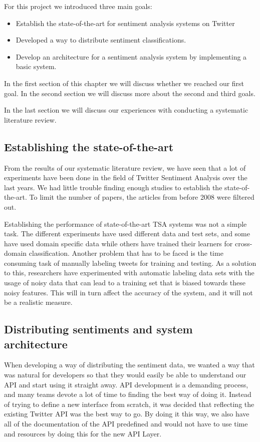 
For this project we introduced three main goals:
\begin{itemize}
\item Establish the state-of-the-art for sentiment analysis systems on Twitter
\item Developed a way to distribute sentiment classifications.
\item Develop an architecture for a sentiment analysis system by implementing a basic system.
\end{itemize}

In the first section of this chapter we will discuss whether we reached our first goal. In the second section we will discuss more about the second and third goals. 

In the last section we will discuss our experiences with conducting a systematic literature review. 


\subsection{Establishing the state-of-the-art}
From the results of our systematic literature review, we have seen that a lot of experiments have been done in the field of Twitter Sentiment Analysis over the last years. We had little trouble finding enough studies to establish the state-of-the-art. To limit the number of papers, the articles from before 2008 were filtered out.

Establishing the performance of state-of-the-art TSA systems was not a simple task. The different experiments have used different data and test sets, and some have used domain specific data while others have trained their learners for cross-domain classification. Another problem that has to be faced is the time consuming task of manually labeling tweets for training and testing. As a solution to this, researchers have experimented with automatic labeling data sets with the usage of noisy data that can lead to a training set that is biased towards these noisy features. This will in turn affect the accuracy of the system, and it will not be a realistic measure. 

\subsection{Distributing sentiments and system architecture}

When developing a way of distributing the sentiment data, we wanted a way that was natural for developers so that they would easily be able to understand our API and start using it straight away. API development is a demanding process, and many teams devote a lot of time to finding the best way of doing it. Instead of trying to define a new interface from scratch, it was decided that reflecting the existing Twitter API was the best way to go. By doing it this way, we also have all of the documentation of the API predefined and would not have to use time and resources by doing this for the new API Layer. 

